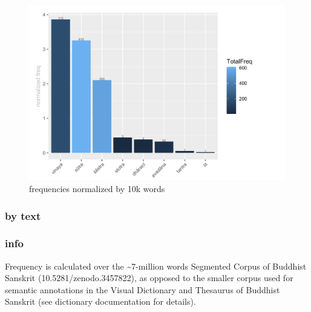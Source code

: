 \documentclass[
  letterpaper,
  DIV=11,
  numbers=noendperiod,
  oneside]{scrreprt}
\begin{document}
\begin{figure}

{\centering \includegraphics{./www/FreqByGenre_prajJapti.png}

}

\caption{\label{fig-freqbygenre}frequencies normalized by 10k words}

\end{figure}

\hypertarget{by-text}{%
\subsubsection{by text}\label{by-text}}


\hypertarget{info-3}{%
\subsubsection{info}\label{info-3}}

Frequency is calculated over the \textasciitilde7-million words
Segmented Corpus of Buddhist Sanskrit (10.5281/zenodo.3457822), as
opposed to the smaller corpus used for semantic annotations in the
Visual Dictionary and Thesaurus of Buddhist Sanskrit (see dictionary
documentation for details).
\end{document}

